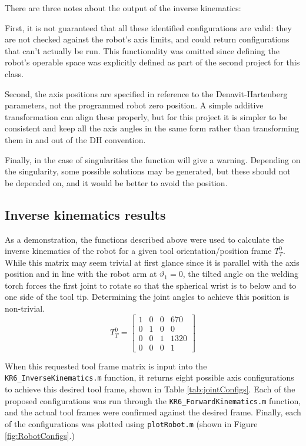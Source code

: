 \documentclass[conference]{IEEEtran}
\begin{document}
There are three notes about the output of the inverse kinematics:

First, it is not guaranteed that all these identified configurations are valid: they are not checked against the robot's axis limits, and could return configurations that can't actually be run. This functionality was omitted since defining the robot's operable space was explicitly defined as part of the second project for this class.

Second, the axis positions are specified in reference to the Denavit-Hartenberg parameters, not the programmed robot zero position. A simple additive transformation can align these properly, but for this project it is simpler to be consistent and keep all the axis angles in the same form rather than transforming them in and out of the DH convention.

Finally, in the case of singularities the function will give a warning. Depending on the singularity, some possible solutions may be generated, but these should not be depended on, and it would be better to avoid the position. 

\subsection{Inverse kinematics results}
As a demonstration, the functions described above were used to calculate the inverse kinematics of the robot for a given tool orientation/position frame $T_T^0$. While this matrix may seem trivial at first glance since it is parallel with the axis position and in line with the robot arm at $\vartheta_1=0$, the tilted angle on the welding torch forces the first joint to rotate so that the spherical wrist is to below and to one side of the tool tip. Determining the joint angles to achieve this position is non-trivial.
$$T_T^0=\begin{bmatrix}
1 & 0 & 0 & 670\\ 
0 & 1 & 0 & 0 \\ 
0 & 0 & 1 & 1320 \\ 
0 & 0 & 0 & 1
\end{bmatrix}$$

When this requested tool frame matrix is input into the \texttt{KR6\_InverseKinematics.m} function, it returns eight possible axis configurations to achieve this desired tool frame, shown in Table \ref{tab:jointConfigs}. Each of the proposed configurations was run through the \texttt{KR6\_ForwardKinematics.m} function, and the actual tool frames were confirmed against the desired frame. Finally, each of the configurations was plotted using \texttt{plotRobot.m} (shown in Figure \ref{fig:RobotConfigs}.)
\end{document}
